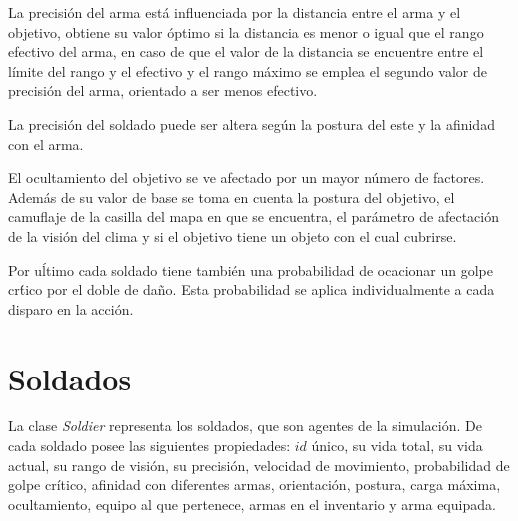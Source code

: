 \documentclass[twoside]{article}
\begin{document}
		La precisi\'on del arma est\'a influenciada por la distancia entre el arma y el objetivo, obtiene su valor \'optimo si la distancia es menor o igual que el rango efectivo del arma, en caso de que el valor de la distancia se encuentre entre el l\'imite del rango y el efectivo y el rango m\'aximo se emplea el segundo valor de precisi\'on del arma, orientado a ser menos efectivo.
		
		La precisi\'on del soldado puede ser altera seg\'un la postura del este y la afinidad con el arma.
		
		El ocultamiento del objetivo se ve afectado por un mayor n\'umero de factores. Adem\'as de su valor de base se toma en cuenta la postura del objetivo, el camuflaje de la casilla del mapa en que se encuentra, el par\'ametro de afectaci\'on de la visi\'on del clima y si el objetivo tiene un objeto con el cual cubrirse.
		
		Por u\'ltimo cada soldado tiene tambi\'en una probabilidad de ocacionar un golpe cr\'tico por el doble de da\~no. Esta probabilidad se aplica individualmente a cada disparo en la acci\'on.
		
		\section{Soldados}
		
		La clase \emph{Soldier} representa los soldados, que son agentes de la simulaci\'on. De cada soldado posee las siguientes propiedades: $id$ \'unico, su vida total, su vida actual, su rango de visi\'on, su precisi\'on, velocidad de movimiento, probabilidad de golpe cr\'itico, afinidad con diferentes armas, orientaci\'on, postura, carga m\'axima, ocultamiento, equipo al que pertenece, armas en el inventario y arma equipada.
		
\end{document}
